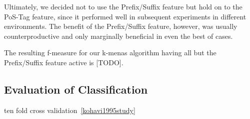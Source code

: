 Ultimately, we decided not to use the Prefix/Suffix feature but hold on to the PoS-Tag feature, since it performed well in subsequent experiments in different environments.
The benefit of the Prefix/Suffix feature, however, was usually counterproductive and only marginally beneficial in even the best of cases.


The resulting f-measure for our k-menas algorithm having all but the Prefix/Suffix feature active is [TODO].


\subsection{Evaluation of Classification}


ten fold cross validation~\ref{kohavi1995study}
